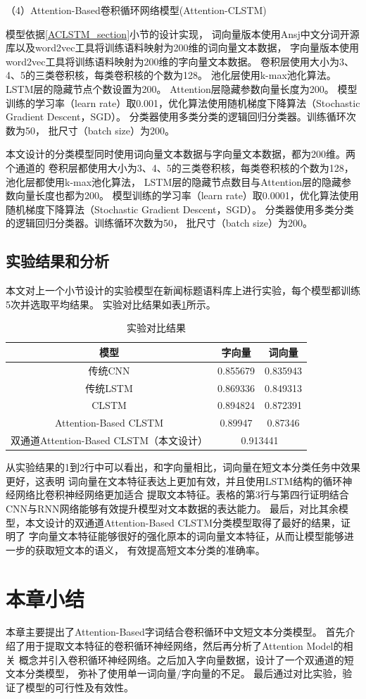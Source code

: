 （4）Attention-Based卷积循环网络模型(Attention-CLSTM)

模型依据\ref{ACLSTM_section}小节的设计实现，
词向量版本使用Ansj中文分词开源库以及word2vec工具将训练语料映射为200维的词向量文本数据，
字向量版本使用word2vec工具将训练语料映射为200维的字向量文本数据。
卷积层使用大小为3、4、5的三类卷积核，每类卷积核的个数为128。
池化层使用k-max池化算法。
LSTM层的隐藏节点个数设置为200。
Attention层隐藏参数向量长度为200。
模型训练的学习率（learn rate）取0.001，优化算法使用随机梯度下降算法（Stochastic Gradient Descent，SGD）。
分类器使用多类分类的逻辑回归分类器。训练循环次数为50，
批尺寸（batch size）为200。

本文设计的分类模型同时使用词向量文本数据与字向量文本数据，都为200维。两个通道的
卷积层都使用大小为3、4、5的三类卷积核，每类卷积核的个数为128，池化层都使用k-max池化算法，
LSTM层的隐藏节点数目与Attention层的隐藏参数向量长度也都为200。
模型训练的学习率（learn rate）取0.0001，优化算法使用随机梯度下降算法（Stochastic Gradient Descent，SGD）。
分类器使用多类分类的逻辑回归分类器。训练循环次数为50，
批尺寸（batch size）为200。
\subsection{实验结果和分析}
本文对上一个小节设计的实验模型在新闻标题语料库上进行实验，每个模型都训练5次并选取平均结果。
实验对比结果如表\ref{classification_result_table}所示。
\begin{table}[h]
    \caption{实验对比结果}
    \begin{tabular}{|c|c|c|}
        \hline
        模型 & 字向量 & 词向量 \\
        \hline
        传统CNN & 0.855679 & 0.835943 \\
        \hline
        传统LSTM & 0.869336 & 0.849313 \\
        \hline
        CLSTM & 0.894824 & 0.872391 \\
        \hline
        Attention-Based CLSTM & 0.89947 & 0.87346 \\
        \hline
        双通道Attention-Based CLSTM（本文设计） & \multicolumn{2}{|c|}{0.913441} \\
        \hline
    \end{tabular}
    \label{classification_result_table}
\end{table}
从实验结果的1到2行中可以看出，和字向量相比，词向量在短文本分类任务中效果更好，这表明
词向量在文本特征表达上更加有效，并且使用LSTM结构的循环神经网络比卷积神经网络更加适合
提取文本特征。表格的第3行与第四行证明结合CNN与RNN网络能够有效提升模型对文本数据的表达能力。
最后，对比其余模型，本文设计的双通道Attention-Based CLSTM分类模型取得了最好的结果，证明了
字向量文本特征能够很好的强化原本的词向量文本特征，从而让模型能够进一步的获取短文本的语义，
有效提高短文本分类的准确率。
\section{本章小结}
 本章主要提出了Attention-Based字词结合卷积循环中文短文本分类模型。
 首先介绍了用于提取文本特征的卷积循环神经网络，然后再分析了Attention Model的相关
 概念并引入卷积循环神经网络。之后加入字向量数据，设计了一个双通道的短文本分类模型，
 弥补了使用单一词向量/字向量的不足。
 最后通过对比实验，验证了模型的可行性及有效性。
